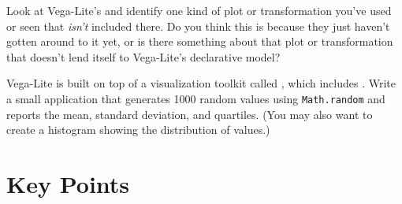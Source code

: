 Look at Vega-Lite's
and identify one kind of plot or transformation you've used or seen
that \emph{isn't} included there.
Do you think this is because they just haven't gotten around to it yet,
or is there something about that plot or transformation
that doesn't lend itself to Vega-Lite's declarative model?


Vega-Lite is built on top of a visualization toolkit called ,
which includes .
Write a small application that generates 1000 random values using \texttt{Math.random}
and reports the mean, standard deviation, and quartiles.
(You may also want to create a histogram showing the distribution of values.)

\section*{Key Points}


